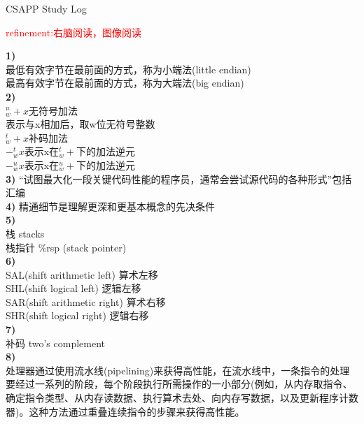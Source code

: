 \documentclass{article}
\newcommand{\red}[1]{\textcolor{red}{#1}}
\begin{document}
\begin{CJK}{UTF8}{gkai}
\end{CJK}
\begin{CJK}{UTF8}{gbsn}
\end{CJK}
\begin{CJK}{UTF8}{uyhei}
\fontsize{40pt}{40pt}\selectfont
\centerline{CSAPP Study Log}			
\fontsize{25pt}{25pt}\selectfont
\centerline{\red{refinement:右脑阅读，图像阅读}}	
\fontsize{18pt}{18pt}\selectfont
\noindent\textbf{1)}		\\
最低有效字节在最前面的方式，称为小端法(little endian)	\\
最高有效字节在最前面的方式，称为大端法(big endian)	\\
\textbf{2)}			\\
$_w^u+x$无符号加法			\\[0.5ex]
表示与x相加后，取w位无符号整数		\\[0.5ex]
$_w^t+x$补码加法			\\[0.5ex]
$-_w^tx$表示x在$^t_w+$下的加法逆元	\\[0.5ex]
$-_w^ux$表示x在$_w^u+$下的加法逆元	\\[1ex]
\textbf{3)}
``试图最大化一段关键代码性能的程序员，通常会尝试源代码的各种形式''包括汇编	\\[1ex]
\textbf{4)}
精通细节是理解更深和更基本概念的先决条件	\\[1ex]
\textbf{5)}	\\
栈	stacks	\\[1ex]
栈指针	\%rsp	(stack pointer)	\\[1ex]
\textbf{6)}	\\
SAL(shift arithmetic left)	算术左移	\\
SHL(shift logical left)		逻辑左移	\\
SAR(shift arithmetic right)	算术右移	\\
SHR(shift logical right)	逻辑右移	\\[1ex]
\textbf{7)}	\\
补码	two's complement	\\
\textbf{8)}	\\
处理器通过使用流水线(pipelining)来获得高性能，在流水线中，一条指令的处理要经过一系列的阶段，每个阶段执行所需操作的一小部分(例如，从内存取指令、确定指令类型、从内存读数据、执行算术去处、向内存写数据，以及更新程序计数器)。这种方法通过重叠连续指令的步骤来获得高性能。	\\[1ex]

\end{CJK}
\end{document}

